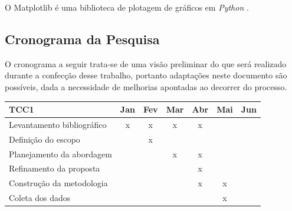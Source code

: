 O Matplotlib é uma biblioteca de plotagem de gráficos em \textit{Python} \cite{Matplotlib}.

\subsection{Cronograma da Pesquisa}

O cronograma a seguir trata-se de uma visão preliminar do que será realizado durante a confecção desse trabalho, portanto adaptações neste documento são possíveis, dada a necessidade de melhorias apontadas ao decorrer do processo.

\begin{table}[h]
	\centering
	\begin{tabular}{@{}lcccccc@{}}
		\toprule
		TCC1                                                & \multicolumn{1}{l}{Jan} & \multicolumn{1}{l}{Fev} & \multicolumn{1}{l}{Mar} & \multicolumn{1}{l}{Abr} & \multicolumn{1}{l}{Mai} & \multicolumn{1}{l}{Jun} \\ \midrule
		Levantamento bibliográfico                          & x                       & x                       & x                       & x                       &                         &                         \\
		Definição do escopo                                 &                         & x                       &                         &                         &                         &                         \\
		Planejamento da abordagem                           &                         &                         & x                       & x                       &                         &                         \\
		Refinamento da proposta                             &                         &                         &                         & x                       &                         &                         \\
		Construção da metodologia                           &                         &                         &                         & x                       & x                       &                         \\
		Coleta dos dados                                    &                         &                         &                         &                         & x                       &                         \\

\end{tabular}
\end{table}
